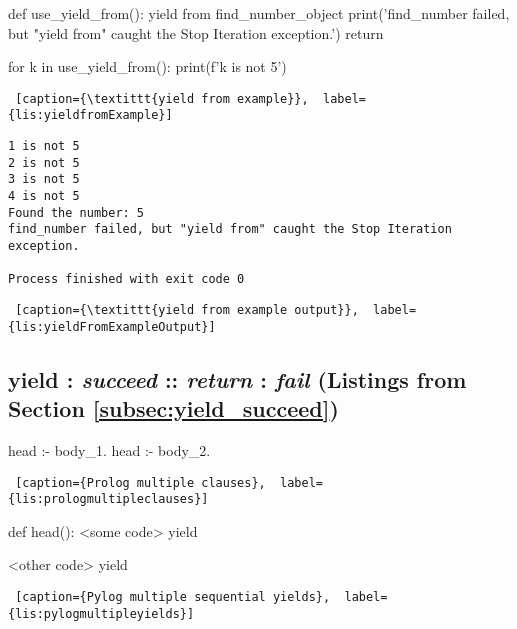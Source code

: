 \noindent
\begin{minipage}{\linewidth}  \largev   
\begin{python}
def use_yield_from():
    yield from find_number_object
    print('find_number failed, but "yield from" caught the Stop Iteration exception.')
    return

for k in use_yield_from():
    print(f'{k} is not 5')
\end{python}
\begin{lstlisting} [caption={\textittt{yield from example}},  label={lis:yieldfromExample}]
\end{lstlisting}
\end{minipage}

\noindent
\begin{minipage}{\linewidth}  \largev   
\begin{verbatim}
1 is not 5
2 is not 5
3 is not 5
4 is not 5
Found the number: 5
find_number failed, but "yield from" caught the Stop Iteration exception.

Process finished with exit code 0
\end{verbatim}
\begin{lstlisting} [caption={\textittt{yield from example output}},  label={lis:yieldFromExampleOutput}]
\end{lstlisting}
\end{minipage}

\subsection{\textbf{yield} : \textit{succeed} :: \textit{return} : \textit{fail} (Listings from Section \ref{subsec:yield_succeed})} \label{appsubsec:yield_succeed}

\begin{minipage}{\linewidth}   \hrulefill  
\begin{python}
head :- body_1.
head :- body_2.
\end{python}
\begin{lstlisting} [caption={Prolog multiple clauses},  label={lis:prologmultipleclauses}]
\end{lstlisting}
\end{minipage}

\noindent
\begin{minipage}{\linewidth}  \largev   
\begin{python}
def head():
    <some code>
    yield
    
    <other code>
    yield
\end{python}
\begin{lstlisting} [caption={Pylog multiple sequential yields},  label={lis:pylogmultipleyields}]
\end{lstlisting}
\end{minipage}

